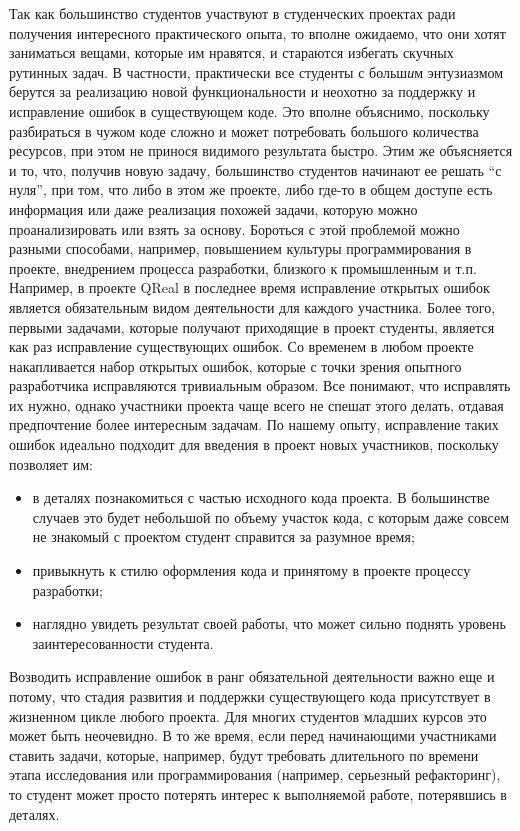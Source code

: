 \documentclass[a4paper]{article}
\begin{document}
Так как большинство студентов участвуют в студенческих проектах ради получения интересного практического опыта, то вполне ожидаемо, что они хотят заниматься вещами, которые им нравятся, и стараются избегать скучных рутинных задач. В частности, практически все студенты  с больш\textit{и}м энтузиазмом берутся за реализацию новой функциональности и неохотно за поддержку и исправление ошибок в существующем коде. Это вполне объяснимо, поскольку разбираться в чужом коде сложно и может потребовать большого количества ресурсов, при этом не принося видимого результата быстро. Этим же объясняется и то, что, получив новую задачу, большинство студентов начинают ее решать “с нуля”, при том, что либо в этом же проекте, либо где-то в общем доступе есть информация или даже реализация похожей задачи, которую можно проанализировать или взять за основу. Бороться с этой проблемой можно разными способами, например, повышением культуры программирования в проекте, внедрением процесса разработки, близкого к промышленным и т.п. Например, в проекте QReal в последнее время исправление открытых ошибок является обязательным видом деятельности для каждого участника. Более того, первыми задачами, которые получают приходящие в проект студенты, является как раз исправление существующих ошибок. Со временем в любом проекте накапливается набор открытых ошибок, которые с точки зрения опытного разработчика исправляются тривиальным образом. Все понимают, что исправлять их нужно, однако участники проекта чаще всего не спешат этого делать, отдавая предпочтение более интересным задачам. По нашему опыту, исправление таких ошибок идеально подходит для введения в проект новых участников, поскольку позволяет им:
\begin{itemize}
 \item в деталях познакомиться с частью исходного кода проекта. В большинстве случаев это будет небольшой по объему участок кода, с которым даже совсем не знакомый с проектом студент справится за разумное время;
 \item привыкнуть к стилю оформления кода и принятому в проекте процессу разработки;
 \item наглядно увидеть результат своей работы, что может сильно поднять уровень заинтересованности студента.
\end{itemize}
Возводить исправление ошибок в ранг обязательной деятельности важно еще и потому, что стадия развития и поддержки существующего кода присутствует в жизненном цикле любого проекта. Для многих студентов младших курсов это может быть неочевидно. В то же время, если перед начинающими участниками ставить задачи, которые, например, будут требовать длительного по времени этапа исследования или программирования (например, серьезный рефакторинг), то студент может просто потерять интерес к выполняемой работе, потерявшись в деталях.
\end{document}
